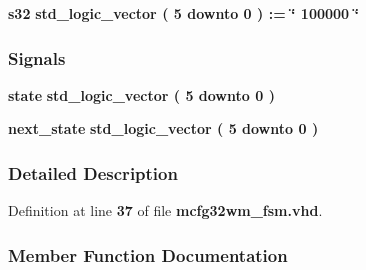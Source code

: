 \begin{DoxyCompactItemize}
\item 
{\bf s32} {\bfseries \textcolor{comment}{std\+\_\+logic\+\_\+vector}\textcolor{vhdlchar}{ }\textcolor{vhdlchar}{(}\textcolor{vhdlchar}{ }\textcolor{vhdlchar}{ } \textcolor{vhdldigit}{5} \textcolor{vhdlchar}{ }\textcolor{keywordflow}{downto}\textcolor{vhdlchar}{ }\textcolor{vhdlchar}{ } \textcolor{vhdldigit}{0} \textcolor{vhdlchar}{ }\textcolor{vhdlchar}{)}\textcolor{vhdlchar}{ }\textcolor{vhdlchar}{ }\textcolor{vhdlchar}{ }\textcolor{vhdlchar}{\+:}\textcolor{vhdlchar}{=}\textcolor{vhdlchar}{ }\textcolor{vhdlchar}{ }\textcolor{vhdlchar}{ }\textcolor{vhdlchar}{ }\textcolor{keyword}{\char`\"{} 100000 \char`\"{}}\textcolor{vhdlchar}{ }} 
\end{DoxyCompactItemize}
\subsubsection*{Signals}
 \begin{DoxyCompactItemize}
\item 
{\bf state} {\bfseries \textcolor{comment}{std\+\_\+logic\+\_\+vector}\textcolor{vhdlchar}{ }\textcolor{vhdlchar}{(}\textcolor{vhdlchar}{ }\textcolor{vhdlchar}{ } \textcolor{vhdldigit}{5} \textcolor{vhdlchar}{ }\textcolor{keywordflow}{downto}\textcolor{vhdlchar}{ }\textcolor{vhdlchar}{ } \textcolor{vhdldigit}{0} \textcolor{vhdlchar}{ }\textcolor{vhdlchar}{)}\textcolor{vhdlchar}{ }} 
\item 
{\bf next\+\_\+state} {\bfseries \textcolor{comment}{std\+\_\+logic\+\_\+vector}\textcolor{vhdlchar}{ }\textcolor{vhdlchar}{(}\textcolor{vhdlchar}{ }\textcolor{vhdlchar}{ } \textcolor{vhdldigit}{5} \textcolor{vhdlchar}{ }\textcolor{keywordflow}{downto}\textcolor{vhdlchar}{ }\textcolor{vhdlchar}{ } \textcolor{vhdldigit}{0} \textcolor{vhdlchar}{ }\textcolor{vhdlchar}{)}\textcolor{vhdlchar}{ }} 
\end{DoxyCompactItemize}


\subsubsection{Detailed Description}


Definition at line {\bf 37} of file {\bf mcfg32wm\+\_\+fsm.\+vhd}.



\subsubsection{Member Function Documentation}
